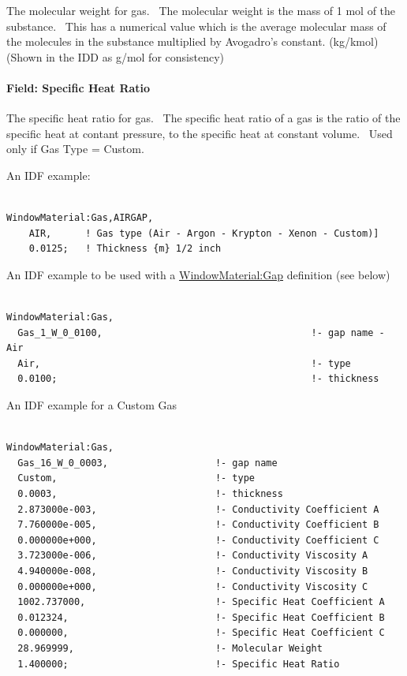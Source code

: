 The molecular weight for gas.~ The molecular weight is the mass of 1 mol of the substance.~ This has a numerical value which is the average molecular mass of the molecules in the substance multiplied by Avogadro's constant. (kg/kmol) (Shown in the IDD as g/mol for consistency)

\paragraph{Field: Specific Heat Ratio}\label{field-specific-heat-ratio-1}

The specific heat ratio for gas.~ The specific heat ratio of a gas is the ratio of the specific heat at contant pressure, to the specific heat at constant volume.~ Used only if Gas Type = Custom.

An IDF example:

\begin{lstlisting}

WindowMaterial:Gas,AIRGAP,
    AIR,      ! Gas type (Air - Argon - Krypton - Xenon - Custom)]
    0.0125;   ! Thickness {m} 1/2 inch
\end{lstlisting}

An IDF example to be used with a \hyperref[windowmaterialgap]{WindowMaterial:Gap} definition (see below)

\begin{lstlisting}

WindowMaterial:Gas,
  Gas_1_W_0_0100,                                     !- gap name - Air
  Air,                                                !- type
  0.0100;                                             !- thickness
\end{lstlisting}

An IDF example for a Custom Gas

\begin{lstlisting}

WindowMaterial:Gas,
  Gas_16_W_0_0003,                   !- gap name
  Custom,                            !- type
  0.0003,                            !- thickness
  2.873000e-003,                     !- Conductivity Coefficient A
  7.760000e-005,                     !- Conductivity Coefficient B
  0.000000e+000,                     !- Conductivity Coefficient C
  3.723000e-006,                     !- Conductivity Viscosity A
  4.940000e-008,                     !- Conductivity Viscosity B
  0.000000e+000,                     !- Conductivity Viscosity C
  1002.737000,                       !- Specific Heat Coefficient A
  0.012324,                          !- Specific Heat Coefficient B
  0.000000,                          !- Specific Heat Coefficient C
  28.969999,                         !- Molecular Weight
  1.400000;                          !- Specific Heat Ratio
\end{lstlisting}

